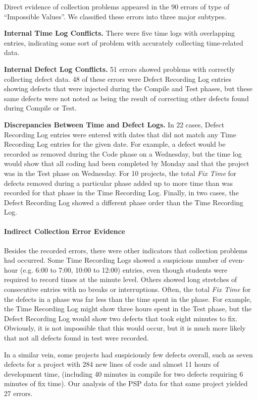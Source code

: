 Direct evidence of collection problems appeared in the 90 errors of
type of ``Impossible Values''.  We classified these errors into
three major subtypes.
      
{\bf Internal Time Log Conflicts.} There were five time logs with
overlapping entries, indicating some sort of problem with accurately
collecting time-related data.

{\bf Internal Defect Log Conflicts.} 51 errors showed problems with
correctly collecting defect data.  48 of these errors were Defect Recording
Log entries showing defects that were injected during the Compile and Test
phases, but these same defects were not noted as being the result of
correcting other defects found during Compile or Test.
      
{\bf Discrepancies Between Time and Defect Logs.} In 22 cases, Defect
Recording Log entries were entered with dates that did not match any Time
Recording Log entries for the given date.  For example, a defect would be
recorded as removed during the Code phase on a Wednesday, but the time log
would show that all coding had been completed by Monday and that the
project was in the Test phase on Wednesday.  For 10 projects, the total
{\it Fix Time} for defects removed during a particular phase added up to
more time than was recorded for that phase in the Time Recording Log.
Finally, in two cases, the Defect Recording Log showed a different phase
order than the Time Recording Log.


\paragraph{Indirect Collection Error Evidence}

Besides the recorded errors, there were other indicators that collection
problems had occurred. Some Time Recording Logs showed a suspicious number
of even-hour (e.g. 6:00 to 7:00, 10:00 to 12:00) entries, even though
students
were required to record times at the minute level.  Others showed
long stretches of consecutive entries with no breaks or interruptions.
Often, the total {\it Fix Time} for the defects in a phase was far less
than the time spent in the phase. For example, the Time Recording Log might
show three hours spent in the Test phase, but the Defect Recording Log
would show two defects that took eight minutes to fix.  Obviously, it is
not impossible that this would occur, but it is much more likely that not
all defects found in test were recorded.  

In a similar vein, some projects had suspiciously few defects overall, such
as seven defects for a project with 284 new lines of code and almost 11 hours 
of development time, (including 40 minutes in compile for two defects requiring 
6 minutes of fix time). Our analysis of the PSP data for that same project 
yielded 27 errors.

